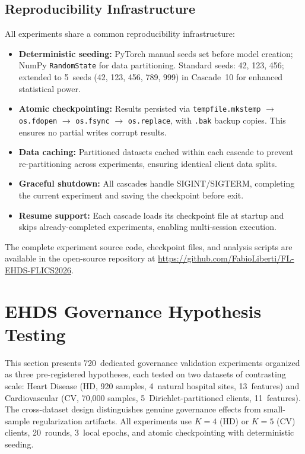 \documentclass[conference]{IEEEtran}
\begin{document}
\subsection{Reproducibility Infrastructure}

All experiments share a common reproducibility infrastructure:

\begin{itemize}
    \item \textbf{Deterministic seeding:} PyTorch manual seeds set before model creation; NumPy \texttt{RandomState} for data partitioning. Standard seeds: 42, 123, 456; extended to 5~seeds (42, 123, 456, 789, 999) in Cascade~10 for enhanced statistical power.
    \item \textbf{Atomic checkpointing:} Results persisted via \texttt{tempfile.mkstemp} $\to$ \texttt{os.fdopen} $\to$ \texttt{os.fsync} $\to$ \texttt{os.replace}, with \texttt{.bak} backup copies. This ensures no partial writes corrupt results.
    \item \textbf{Data caching:} Partitioned datasets cached within each cascade to prevent re-partitioning across experiments, ensuring identical client data splits.
    \item \textbf{Graceful shutdown:} All cascades handle SIGINT/SIGTERM, completing the current experiment and saving the checkpoint before exit.
    \item \textbf{Resume support:} Each cascade loads its checkpoint file at startup and skips already-completed experiments, enabling multi-session execution.
\end{itemize}

\noindent The complete experiment source code, checkpoint files, and analysis scripts are available in the open-source repository at \url{https://github.com/FabioLiberti/FL-EHDS-FLICS2026}.

\section{EHDS Governance Hypothesis Testing}
\label{sec:governance_hypotheses}

This section presents 720~dedicated governance validation experiments organized as three pre-registered hypotheses, each tested on two datasets of contrasting scale: Heart Disease (HD, 920 samples, 4~natural hospital sites, 13~features) and Cardiovascular (CV, 70,000 samples, 5~Dirichlet-partitioned clients, 11~features). The cross-dataset design distinguishes genuine governance effects from small-sample regularization artifacts. All experiments use $K{=}4$ (HD) or $K{=}5$ (CV) clients, 20~rounds, 3~local epochs, and atomic checkpointing with deterministic seeding.
\end{document}
